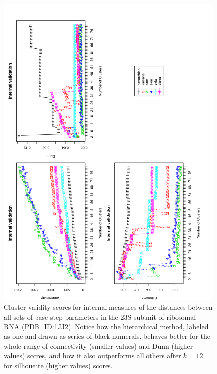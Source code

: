 \begin{figure}
 \centering
\includegraphics[angle=0, scale=0.34]{Chapter2/STval_int.png}
\caption{Cluster  validity   scores  for  internal   measures  of  the
  distances  between  all sets  of  base-step  parameters  in the  23S
  subunit of ribosomal RNA (PDB\_ID:1JJ2). Notice how the hierarchical
  method,  labeled as  one  and  drawn as  series  of black  numerals,
  behaves better for the  whole range of connectivity (smaller values)
  and Dunn  (higher values)  scores, and how  it also  outperforms all
  others after $k=12$ for silhouette (higher values) scores.}
 \label{fig:internal}
\end{figure}

